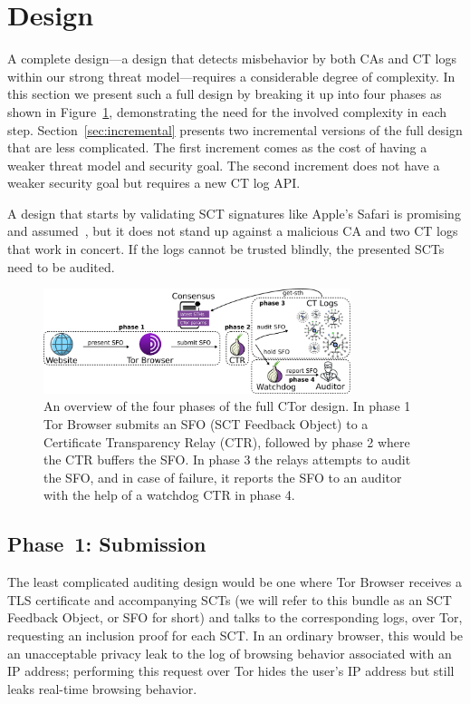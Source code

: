 \section{Design} \label{sec:base}
A complete design---a design that detects misbehavior by both CAs and CT logs
within our strong threat model---requires a considerable degree of
complexity. In this section we present such a full design by breaking it up
into four phases as shown in Figure~\ref{fig:design}, demonstrating the need for
the involved complexity in each step.  Section~\ref{sec:incremental} presents
two incremental versions of the full design that are less complicated.  The
first increment comes as the cost of having a weaker threat model and security
goal.  The second increment does not have a weaker security goal but requires a
new CT log API.

A design that starts by validating SCT signatures like Apple's Safari is
promising and assumed~\cite{safari-policy,apple-on-independence}, but it does
not stand up against a malicious CA and two CT logs that work in concert.  If
the logs cannot be trusted blindly, the presented SCTs need to be audited.

\begin{figure}
    \centering
	\includegraphics[width=0.8\textwidth]{img/design-full}
	\vspace{-8px}
	\caption{%
		An overview of the four phases of the full CTor design. In phase 1 Tor
	Browser submits an SFO (SCT Feedback Object) to a Certificate Transparency
	Relay (CTR), followed by phase 2 where the CTR buffers the SFO. In phase 3
	the relays attempts to audit the SFO, and in case of failure, it reports the
	SFO to an auditor with the help of a watchdog CTR in phase 4.}
	\label{fig:design}
	\vspace{-10px}
\end{figure}

\subsection{Phase~1: Submission} \label{sec:base:phase1}

The least complicated auditing design would be one where Tor Browser receives a
TLS certificate and accompanying SCTs (we will refer to this bundle as an SCT
Feedback Object, or SFO for short) and talks to the corresponding logs, over
Tor, requesting an inclusion proof for each SCT. In an ordinary browser, this
would be an unacceptable privacy leak to the log of browsing behavior associated
with an IP address; performing this request over Tor hides the user's IP address
but still leaks real-time browsing behavior.


